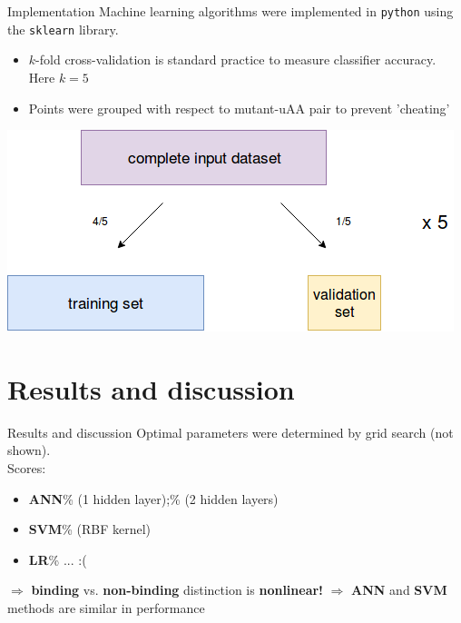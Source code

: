 \documentclass{beamer}
\begin{document}
\begin{frame}{Implementation}
    Machine learning algorithms were implemented in \texttt{python} using the \texttt{sklearn} library.
    \begin{itemize}
        \item $k$-fold cross-validation is standard practice to measure classifier accuracy. Here $k = 5$
        \item Points were grouped with respect to mutant-uAA pair to prevent 'cheating'
    \end{itemize}
    
    \center\quad\quad\includegraphics[width=0.6\linewidth]{CVdiagram.png}
\end{frame}

\section{Results and discussion}
\begin{frame}{Results and discussion}
    Optimal parameters were determined by grid search (not shown).\\
    Scores:
    \begin{itemize}
        \item \textbf{ANN}\% (1 hidden layer);\% (2 hidden layers)
        \item \textbf{SVM}\% (RBF kernel)
        \item \textbf{LR}\% ... :(
    \end{itemize}
    
    $\Rightarrow$ \textbf{binding} vs. \textbf{non-binding} distinction is \textbf{nonlinear!}
    $\Rightarrow$ \textbf{ANN} and \textbf{SVM} methods are similar in performance
\end{frame}
\end{document}
